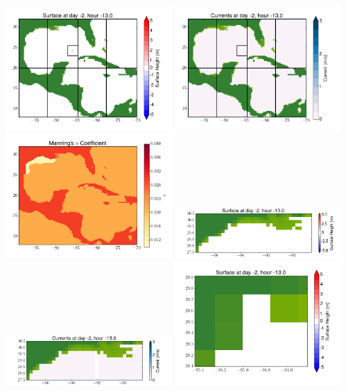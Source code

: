 \documentclass[11pt]{article}
\begin{document}
\vskip 10pt 
\includegraphics[width=0.475\textwidth]{frame0011fig1.png}
\includegraphics[width=0.475\textwidth]{frame0011fig2.png}
\vskip 10pt 
\includegraphics[width=0.475\textwidth]{frame0011fig3.png}
\includegraphics[width=0.475\textwidth]{frame0011fig4.png}
\vskip 10pt 
\includegraphics[width=0.475\textwidth]{frame0011fig5.png}
\includegraphics[width=0.475\textwidth]{frame0011fig6.png}
\end{document}
